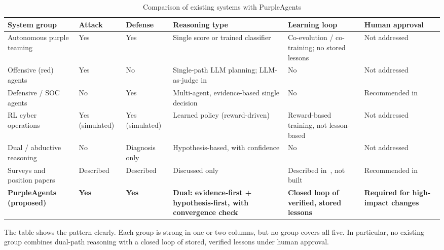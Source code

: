 \begin{table}[H]
\centering
\caption{Comparison of existing systems with PurpleAgents}
\label{tab:compare}
\footnotesize
\setlength{\tabcolsep}{4pt}
\begin{tabularx}{\textwidth}{@{}P{0.19\textwidth} P{0.095\textwidth} P{0.11\textwidth} Y Y P{0.15\textwidth}@{}}
\toprule
\textbf{System group} & \textbf{Attack} & \textbf{Defense} & \textbf{Reasoning type} & \textbf{Learning loop} & \textbf{Human approval} \\
\midrule
Autonomous purple teaming~\cite{park2025autopt,zhou2024pad} & Yes & Yes & Single score or trained classifier & Co-evolution / co-training; no stored lessons & Not addressed \\
Offensive (red) agents~\cite{kong2025vulnbot,challita2025redteamllm,mamun2026adversary,deng2024pentestgpt,xu2024autoattacker,fang2024hack,singer2025incalmo} & Yes & No & Single-path LLM planning; LLM-as-judge in~\cite{mamun2026adversary} & No & Not addressed \\
Defensive / SOC agents~\cite{wei2025cortex,soc2025survey,lazer2026agentic} & No & Yes & Multi-agent, evidence-based single decision & No & Recommended in~\cite{lazer2026agentic} \\
RL cyber operations~\cite{baillie2020cyborg,palmer2024drl,symes2024entity,singh2025hmarl,li2023redcase,shaikh2026soar} & Yes (simulated) & Yes (simulated) & Learned policy (reward-driven) & Reward-based training, not lesson-based & Not addressed \\
Dual / abductive reasoning~\cite{araujo2021evidential,ramkumar2025abductive} & No & Diagnosis only & Hypothesis-based, with confidence & No & Not addressed \\
Surveys and position papers~\cite{abuadbba2025peril,zhang2025llmcyber,xu2024llm4security,xu2025forewarned,li2025shields} & Described & Described & Discussed only & Described in~\cite{li2025shields}, not built & Recommended in~\cite{abuadbba2025peril} \\
\midrule
\textbf{PurpleAgents (proposed)} & \textbf{Yes} & \textbf{Yes} & \textbf{Dual: evidence-first + hypothesis-first, with convergence check} & \textbf{Closed loop of verified, stored lessons} & \textbf{Required for high-impact changes} \\
\bottomrule
\end{tabularx}
\end{table}

The table shows the pattern clearly. Each group is strong in one or two columns,
but no group covers all five. In particular, no existing group combines dual-path
reasoning with a closed loop of stored, verified lessons under human approval.

